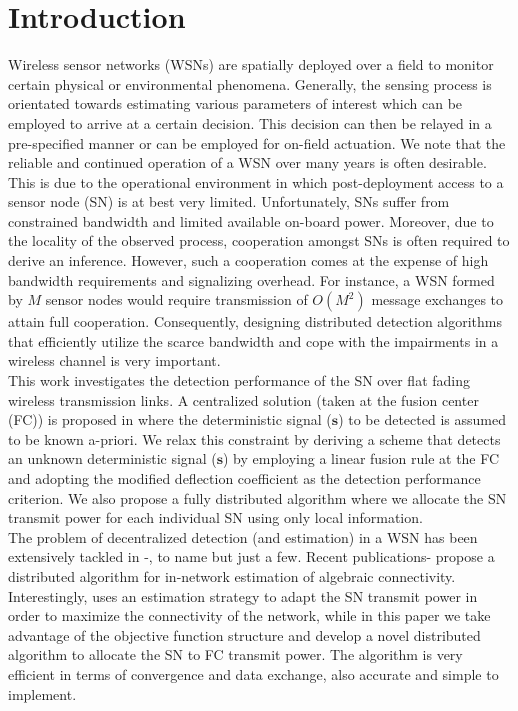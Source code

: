 \documentclass[conference]{IEEEtran}
\begin{document}
\section{Introduction}
\label{sec:intro}
Wireless sensor networks (WSNs) are spatially deployed over a field to monitor certain physical or environmental phenomena. Generally, the sensing process is orientated towards estimating various parameters of interest which can be employed to arrive at a certain decision. This decision can then be relayed in a pre-specified manner or can be employed for on-field actuation. We note that the reliable and continued operation of a WSN over many years is often desirable. This is due to the operational environment in which post-deployment access to a sensor node (SN) is at best very limited. Unfortunately, SNs suffer from constrained bandwidth and limited available on-board power. Moreover, due to the locality of the observed process, cooperation amongst SNs is often required to derive an inference. However, such a cooperation comes at the expense of high bandwidth requirements and signalizing overhead. For instance, a WSN formed by $M$ sensor nodes would require transmission of $O(M^2)$ message  exchanges to attain full cooperation. Consequently, designing distributed detection algorithms that efficiently utilize the scarce bandwidth and cope with the impairments in a wireless channel is very important. \\
\indent This work investigates the detection performance of the SN over flat fading wireless transmission links. A centralized solution (taken at the fusion center (FC)) is proposed in \cite{les82} where the deterministic signal ($\boldsymbol s$) to be detected is assumed to be known a-priori. We relax this constraint by deriving a scheme that detects an unknown deterministic signal ($\boldsymbol s$) by employing a linear fusion rule at the FC and adopting the modified deflection coefficient as the detection performance criterion. We also propose a fully distributed algorithm where we allocate the SN transmit power for each individual SN using only local information.   \\
\indent The problem of decentralized detection (and estimation) in a WSN has been extensively tackled in \cite{les82}-\hspace{-0.005cm}\cite{les94}, to name but just a few. Recent publications\cite{Bertrand}-\hspace{-0.005cm}\cite{Lorenzo} propose a distributed algorithm for in-network estimation of algebraic connectivity. Interestingly, \cite{Lorenzo} uses an estimation strategy to adapt the SN transmit power in order to maximize the connectivity of the network, while in this paper we take advantage of the objective function structure and develop a novel distributed algorithm to allocate the SN to FC transmit power. The algorithm is very efficient in terms of convergence and data exchange, also accurate and simple to implement.\\
\end{document}
